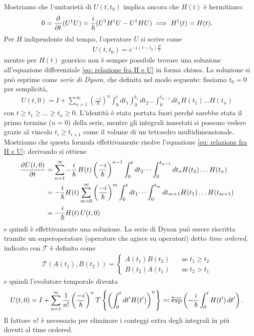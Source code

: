 Mostriamo che l'unitarietà di $ U(t,t_0) $ implica ancora che $ H(t) $ è hermitiano:
\begin{align*}
  0 = \frac{\partial^{} {}}{\partial {t}^{}} (U^\dag U) = \frac{i}{\hbar} ( U^\dag H^\dag U - U^\dag H U) \implies H^\dag(t) = H(t).
\end{align*}
Per $ H $ indipendente dal tempo, l'operatore $ U $ si scrive come 
\begin{align*}
  U(t,t_0) = e^{ - i (t - t_0) \frac{H}{\hbar}} 
\end{align*}
mentre per $ H(t) $ generico non è sempre possibile trovare una soluzione all'equazione differenziale \eqref{eq: relazione fra H e U} in forma chiusa.
La soluzione si può esprime come \textit{serie di Dyson}, che definita nel modo seguente: fissiamo $ t_0 = 0 $ per semplicità,
\begin{align*}
  U(t, 0) = I + \sum_{n = 1}^\infty \left( \frac{-i}\hbar \right)^n \int_0^t dt_1 \int_0^{t_1} dt_2 \dots \int_0^{t_{n-1}} dt_n H(t_1) \dots H(t_n)
\end{align*}
con $ t \geq t_1 \geq \dots \geq t_n \geq 0 $. L'identità è stata portata fuori perché sarebbe stata il primo termine ($ n = 0 $) della serie, 
mentre gli integrali innestati si possono vedere grazie al vincolo $ t_{i} \geq t_{i+1} $ come il volume di un tetraedro multidimensionale.
Mostriamo che questa formula effettivamente risolve l'equazione \eqref{eq: relazione fra H e U}: derivando si ottiene 
\begin{align*}
  \frac{\partial^{} {U(t,0)}}{\partial {t}^{}} 
  &= \sum_{n = 1}^\infty -\frac{i}\hbar \,H(t) \left( \frac{-i}\hbar \right)^{n-1} \int_0^{t} dt_2 \dots \int_0^{t_{n-1}} dt_n H(t_2) \dots H(t_n) 
  \\
  &= -\frac{i}\hbar H(t) \sum_{m = 0}^\infty \left( \frac{-i}\hbar \right)^m \int_0^{t} dt_1 \dots \int_0^{t_{m}} dt_{m+1} H(t_1) \dots H(t_{m+1}) 
  \\
  &= -\frac{i}\hbar H(t) \,U(t,0)
\end{align*}
e quindi è effettivamente una soluzione. La serie di Dyson può essere riscritta tramite un superoperatore (operatore che agisce su operatori) 
detto \textit{time ordered}, indicato con $ \mathcal{T} $ è definito come 
\begin{align*}
  \mathcal{T}(A(t_1), B(t_2)) = 
  \begin{cases}
    A(t_1) B(t_2) \quad &\text{se} \; t_1 \geq t_2
    \\
    B(t_2) A(t_1) \quad &\text{se} \; t_2 > t_1
  \end{cases}
\end{align*}
e quindi l'evolutore temporale diventa
\begin{align*}
  U(t,0) = I + \sum_{n=1}^\infty \frac1{n!} \left( \frac{-i}\hbar \right)^n \mathcal{T} \left\{ \left( \int_0^t dt' H(t') \right)^n \right\}
  \eqcolon \mathop{\overleftarrow{\exp}}\nolimits\left( -\frac{i}\hbar \int_0^t H(t')\,dt' \right).
\end{align*}
Il fattore $ n! $ è necessario per eliminare i conteggi extra degli integrali in più dovuti al time ordered.

